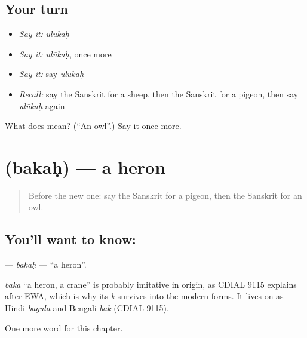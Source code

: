 \subsection*{Your turn}
\begin{itemize}
\raggedright
  \item \emph{Say it:} \emph{ulūkaḥ}
  \item \emph{Say it:} \emph{ulūkaḥ}, once more
  \item \emph{Say it:} say \emph{ulūkaḥ}
  \item \emph{Recall:} say the Sanskrit for a sheep, then the Sanskrit for a pigeon, then say \emph{ulūkaḥ} again
\end{itemize}

\begin{tcolorbox}[breakable,colback=teal!4,colframe=teal!35!black,title={Before you move on}]
What does  mean? (\textquotedblleft{}An owl\textquotedblright{}.) Say it once more.
\end{tcolorbox}
\section[\texorpdfstring{\sk{बकः} (bakaḥ)}{बकः (bakaḥ)}]{ (bakaḥ) — a heron}

\label{lesson:SA-C114-bakah}



\begin{quote}
Before the new one: say the Sanskrit for a pigeon, then the Sanskrit for an owl.
\end{quote}

\subsection*{You'll want to know: }
\textbf{} — \emph{bakaḥ} — \textquotedblleft{}a heron\textquotedblright{}.

\begin{cousinweb}
\emph{baka} \textquotedblleft{}a heron, a crane\textquotedblright{} is probably imitative in origin, as CDIAL 9115 explains after EWA, which is why its \emph{k} survives into the modern forms. It lives on as Hindi \emph{bagulā} and Bengali \emph{bak} (CDIAL 9115).
\end{cousinweb}

\begin{grammarlens}[title={What you've built}]
One more word for this chapter.
\end{grammarlens}

